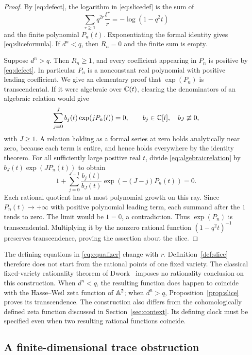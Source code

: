 \begin{proof}
By \eqref{eq:defect}, the logarithm in \eqref{eq:slicedef} is the sum of
\[
 \sum_{r\geq1}q^{2r}\frac{t^r}{r}=-\log(1-q^2t)
\]
and the finite polynomial $P_n(t)$. Exponentiating the formal identity
gives \eqref{eq:sliceformula}. If $d^n<q$, then $R_n=0$ and the finite
sum is empty.

Suppose $d^n>q$. Then $R_n\geq1$, and every coefficient appearing
in $P_n$ is positive by \eqref{eq:defect}. In particular $P_n$ is a
nonconstant real polynomial with positive leading coefficient. We give
an elementary proof that $\exp(P_n)$ is transcendental. If it were
algebraic over $\mathbb C(t)$, clearing the denominators of an algebraic
relation would give
\begin{equation}\label{eq:algebraicrelation}
 \sum_{j=0}^{J}b_j(t)\exp(jP_n(t))=0,
 \qquad b_j\in\mathbb C[t],\quad b_J\not\equiv0,
\end{equation}
with $J\geq1$. A relation holding as a formal series at zero holds
analytically near zero, because each term is entire, and hence holds
everywhere by the identity theorem. For all sufficiently large positive
real $t$, divide \eqref{eq:algebraicrelation} by
$b_J(t)\exp(JP_n(t))$ to obtain
\[
 1+\sum_{j=0}^{J-1}
 \frac{b_j(t)}{b_J(t)}\exp(-(J-j)P_n(t))=0.
\]
Each rational quotient has at most polynomial growth on this ray.
Since $P_n(t)\to+\infty$ with positive polynomial leading term,
each summand after the $1$ tends to zero. The limit would be $1=0$,
a contradiction. Thus $\exp(P_n)$ is transcendental. Multiplying it
by the nonzero rational function $(1-q^2t)^{-1}$ preserves
transcendence, proving the assertion about the slice.
\end{proof}

The defining equations in \eqref{eq:equalizer} change with $r$.
Definition~\ref{def:slice} therefore does not start from the rational
points of one fixed variety. The classical fixed-variety rationality
theorem of Dwork~\cite{dwork1960rationality} imposes no rationality
conclusion on this construction. When $d^n<q$, the resulting function
does happen to coincide with the Hasse--Weil zeta function of $\mathbb A^2$;
when $d^n>q$, Proposition~\ref{prop:slice} proves its transcendence.
The construction also differs from the cohomologically defined zeta
function discussed in Section~\ref{sec:context}. Its defining clock
must be specified even when two resulting rational functions coincide.

\subsection{A finite-dimensional trace obstruction}

